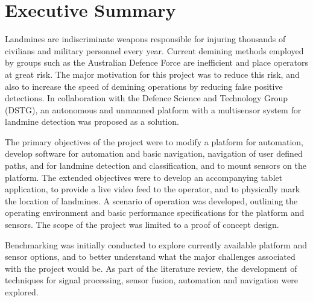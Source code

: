 \documentclass[main.tex]{subfiles}
\begin{document}

{}	%
\chapter*{Executive Summary}
  

Landmines are indiscriminate weapons responsible for injuring thousands of civilians and military personnel every year. Current demining methods employed by groups such as the Australian Defence Force are inefficient and place operators at great risk. The major motivation for this project was to reduce this risk, and also to increase the speed of demining operations by reducing false positive detections. In collaboration with the Defence Science and Technology Group (DSTG), an autonomous and unmanned platform with a multisensor system for landmine detection was proposed as a solution. 

The primary objectives of the project were to modify a platform for automation, develop software for automation and basic navigation, navigation of user defined paths, and for landmine detection and classification, and to mount sensors on the platform. The extended objectives were to develop an accompanying tablet application, to provide a live video feed to the operator, and to physically mark the location of landmines. A scenario of operation was developed, outlining the operating environment and basic performance specifications for the platform and sensors. The scope of the project was limited to a proof of concept design.

Benchmarking was initially conducted to explore currently available platform and sensor options, and to better understand what the major challenges associated with the project would be. As part of the literature review, the development of techniques for signal processing, sensor fusion, automation and navigation were explored.        
\end{document}
